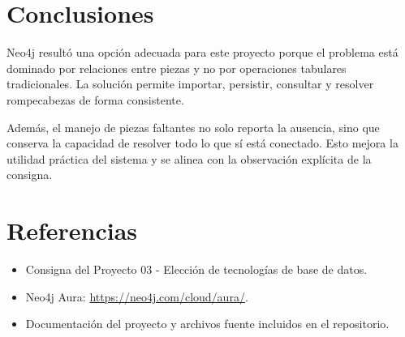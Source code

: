 \documentclass[11pt,a4paper]{article}
\begin{document}
\section{Conclusiones}
Neo4j resultó una opción adecuada para este proyecto porque el problema está dominado por relaciones entre piezas y no por operaciones tabulares tradicionales. La solución permite importar, persistir, consultar y resolver rompecabezas de forma consistente.

Además, el manejo de piezas faltantes no solo reporta la ausencia, sino que conserva la capacidad de resolver todo lo que sí está conectado. Esto mejora la utilidad práctica del sistema y se alinea con la observación explícita de la consigna.

\section{Referencias}
\begin{itemize}[leftmargin=1.2cm]
    \item Consigna del Proyecto 03 - Elección de tecnologías de base de datos.
    \item Neo4j Aura: \url{https://neo4j.com/cloud/aura/}.
    \item Documentación del proyecto y archivos fuente incluidos en el repositorio.
\end{itemize}
\end{document}
